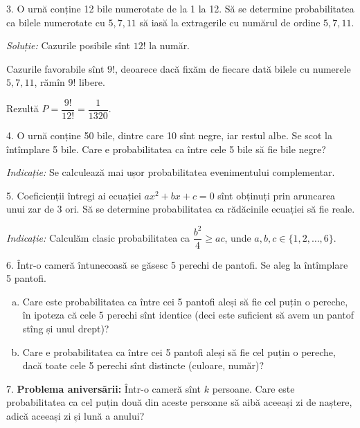 \vspace{0.3cm}

3. O urnă conține 12 bile numerotate de la 1 la 12. Să se determine probabilitatea
ca bilele numerotate cu $ 5, 7, 11 $ să iasă la extragerile cu numărul de ordine
$ 5, 7, 11 $.

\emph{Soluție:} Cazurile posibile sînt $ 12! $ la număr.

Cazurile favorabile sînt $ 9! $, deoarece dacă fixăm de fiecare dată bilele cu numerele
$ 5, 7, 11 $, rămîn $ 9! $ libere.

Rezultă $ P = \dfrac{9!}{12!} = \dfrac{1}{1320} $.

\vspace{0.3cm}

4. O urnă conține 50 bile, dintre care 10 sînt negre, iar restul albe. Se scot la întîmplare
5 bile. Care e probabilitatea ca între cele 5 bile să fie bile negre?

\emph{Indicație:} Se calculează mai ușor probabilitatea evenimentului complementar.

\vspace{0.3cm}

5. Coeficienții întregi ai ecuației $ ax^2 + bx + c = 0 $ sînt obținuți prin aruncarea
unui zar de 3 ori. Să se determine probabilitatea ca rădăcinile ecuației să fie reale.

\emph{Indicație:} Calculăm clasic probabilitatea ca $ \dfrac{b^2}{4} \geq ac $,
unde $ a, b, c \in \{ 1, 2, \dots, 6 \} $.

\vspace{0.3cm}

6. Într-o cameră întunecoasă se găsesc 5 perechi de pantofi. Se aleg la întîmplare
5 pantofi.

\begin{enumerate}[(a)]
\item Care este probabilitatea ca între cei 5 pantofi aleși să fie cel puțin o pereche,
  în ipoteza că cele 5 perechi sînt identice (deci este suficient să avem un pantof
  stîng și unul drept)?
\item Care e probabilitatea ca între cei 5 pantofi aleși să fie cel puțin o pereche,
  dacă toate cele 5 perechi sînt distincte (culoare, număr)?
\end{enumerate}

\vspace{0.3cm}

7. \textbf{Problema aniversării:} Într-o cameră sînt $ k $ persoane. Care este
probabilitatea ca cel puțin două din aceste persoane să aibă aceeași zi de naștere,
adică aceeași zi și lună a anului?

